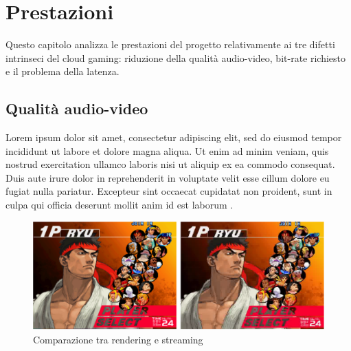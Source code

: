 %
%

\chapter{Prestazioni} \label{cap:cap4}
Questo capitolo analizza le prestazioni del progetto relativamente ai tre difetti intrinseci del cloud gaming: riduzione della qualità audio-video, bit-rate richiesto e il problema della latenza.



\section{Qualità audio-video}
Lorem ipsum dolor sit amet, consectetur adipiscing elit, sed do eiusmod tempor incididunt ut labore et dolore magna aliqua. Ut enim ad minim veniam, quis nostrud exercitation ullamco laboris nisi ut aliquip ex ea commodo consequat. Duis aute irure dolor in reprehenderit in voluptate velit esse cillum dolore eu fugiat nulla pariatur. Excepteur sint occaecat cupidatat non proident, sunt in culpa qui officia deserunt mollit anim id est laborum \parencite{alma991017214718006031}.

\begin{figure}[H]
	\includegraphics[width=\linewidth]{immagini/ssf3_compare}
	\caption{Comparazione tra rendering e streaming}
	\label{fig:ssf3_compare}
\end{figure}

